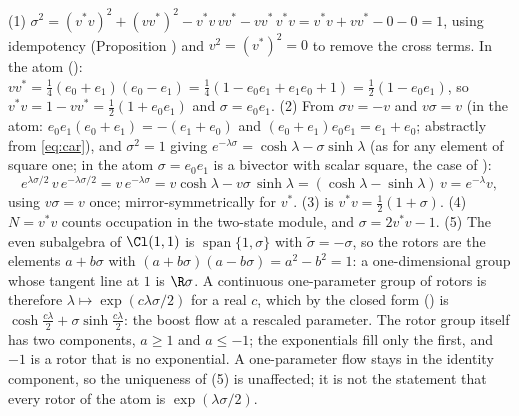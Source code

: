 (1) $\sigma^2 = (v^*v)^2 + (vv^*)^2 - v^*v\,vv^* - vv^*\,v^*v = v^*v + vv^* - 0 - 0 = 1$, using idempotency (Proposition ) and $v^2 = (v^*)^2 = 0$ to remove the cross terms. In the atom (): $v v^* = \tfrac14(e_0 + e_1)(e_0 - e_1) = \tfrac14(1 - e_0e_1 + e_1e_0 + 1) = \tfrac12(1 - e_0e_1)$, so $v^*v = 1 - vv^* = \tfrac12(1 + e_0e_1)$ and $\sigma = e_0 e_1$. (2) From $\sigma v = -v$ and $v\sigma = v$ (in the atom: $e_0e_1(e_0 + e_1) = -(e_1 + e_0)$ and $(e_0+e_1)e_0e_1 = e_1 + e_0$; abstractly from \eqref{eq:car}), and $\sigma^2 = 1$ giving $e^{-\lambda\sigma} = \cosh\lambda - \sigma\sinh\lambda$ (as for any element of square one; in the atom $\sigma = e_0 e_1$ is a bivector with scalar square, the case of ):
\[
e^{\lambda\sigma/2}\,v\,e^{-\lambda\sigma/2} = v\,e^{-\lambda\sigma} = v\cosh\lambda - v\sigma\,\sinh\lambda = (\cosh\lambda - \sinh\lambda)\,v = e^{-\lambda}v ,
\]
using $v\sigma = v$ once; mirror-symmetrically for $v^*$. (3) is $v^*v = \tfrac12(1 + \sigma)$. (4) $N = v^*v$ counts occupation in the two-state module, and $\sigma = 2v^*v - 1$. (5) The even subalgebra of $\Cl(1,1)$ is $\operatorname{span}\{1, \sigma\}$ with $\tilde\sigma = -\sigma$, so the rotors are the elements $a + b\sigma$ with $(a + b\sigma)(a - b\sigma) = a^2 - b^2 = 1$: a one-dimensional group whose tangent line at $1$ is $\R\sigma$. A continuous one-parameter group of rotors is therefore $\lambda \mapsto \exp(c\lambda\sigma/2)$ for a real $c$, which by the closed form () is $\cosh\tfrac{c\lambda}{2} + \sigma\sinh\tfrac{c\lambda}{2}$: the boost flow at a rescaled parameter. The rotor group itself has two components, $a \ge 1$ and $a \le -1$; the exponentials fill only the first, and $-1$ is a rotor that is no exponential. A one-parameter flow stays in the identity component, so the uniqueness of (5) is unaffected; it is not the statement that every rotor of the atom is $\exp(\lambda\sigma/2)$.
